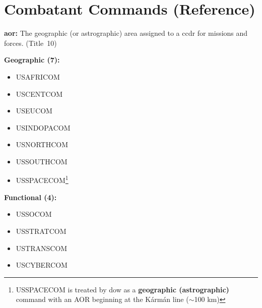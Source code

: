 \documentclass[../main.tex]{subfiles}
\begin{document}
\section{Combatant Commands (Reference)}
\noindent\textbf{\ac{aor}:} The geographic (or astrographic) area assigned to a \ac{ccdr} for missions and forces. (Title~10) %

\textbf{Geographic (7):}
\begin{itemize}
	\item USAFRICOM
	\item USCENTCOM
	\item USEUCOM
	\item USINDOPACOM
	\item USNORTHCOM
	\item USSOUTHCOM
	\item USSPACECOM\footnote{USSPACECOM is treated by \ac{dow} as a \textbf{geographic (astrographic)} command with an AOR beginning at the K\'{a}rm\'{a}n line ($\sim$100 km)}\\
\end{itemize}
\textbf{Functional (4):}
\begin{itemize}
	\item USSOCOM
	\item USSTRATCOM
	\item USTRANSCOM
	\item USCYBERCOM
\end{itemize}
\end{document}
